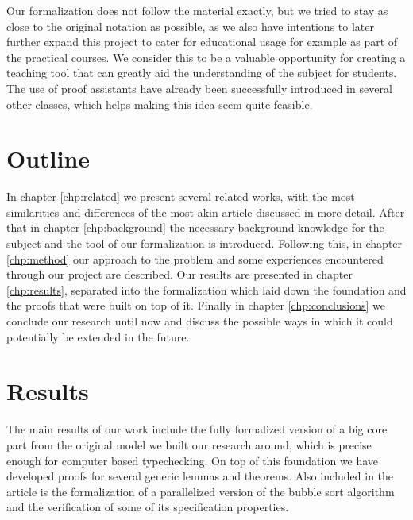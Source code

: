 Our formalization does not follow the material exactly, but we tried to stay as close to the original notation as possible, as we also have intentions to later further expand this project to cater for educational usage for example as part of the practical courses. We consider this to be a valuable opportunity for creating a teaching tool that can greatly aid the understanding of the subject for students. The use of proof assistants have already been successfully introduced in several other classes\cite{formalsemantics-typesystems}, which helps making this idea seem quite feasible.

\section{Outline}

In chapter \ref{chp:related} we present several related works, with the most similarities and differences of the most akin article discussed in more detail. After that in chapter \ref{chp:background} the necessary background knowledge for the subject and the tool of our formalization is introduced. Following this, in chapter \ref{chp:method} our approach to the problem and some experiences encountered through our project are described. Our results are presented in chapter \ref{chp:results}, separated into the formalization which laid down the foundation and the proofs that were built on top of it. Finally in chapter \ref{chp:conclusions} we conclude our research until now and discuss the possible ways in which it could potentially be extended in the future.

\section{Results}

The main results of our work include the fully formalized version of a big core part from the original model we built our research around, which is precise enough for computer based typechecking. On top of this foundation we have developed proofs for several generic lemmas and theorems. Also included in the article is the formalization of a parallelized version of the bubble sort algorithm and the verification of some of its specification properties.
